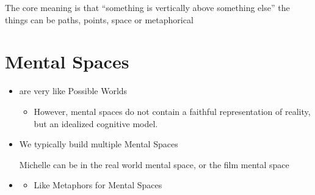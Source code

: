 \documentclass[headrule,footrule]{foils}
\begin{document}
\begin{exe}
  \ex {}
  \ex {}
  \ex {}
  \ex {}
  \ex {}
  \ex {}
  \ex {}
  \ex {}
  \ex {}
  \ex {}
  \ex {}
\end{exe}

The core meaning is that ``something is vertically above something
else'' the things can be paths, points, space or metaphorical
\section{Mental Spaces}


\begin{itemize}
\item {} are very like Possible Worlds
  \begin{itemize}
  \item However, mental spaces do not contain a faithful
    representation of reality, but an idealized cognitive model.
  \end{itemize}
\item We typically build multiple Mental Spaces
  \begin{exe}
  \ex {}
  \end{exe}
Michelle can be in the real world mental space, or the film mental space
\item {}
  \begin{itemize}
  \item Like Metaphors for Mental Spaces
  \end{itemize}
  \begin{exe}
    \ex {}
  \end{exe}
\end{itemize}
\end{document}
